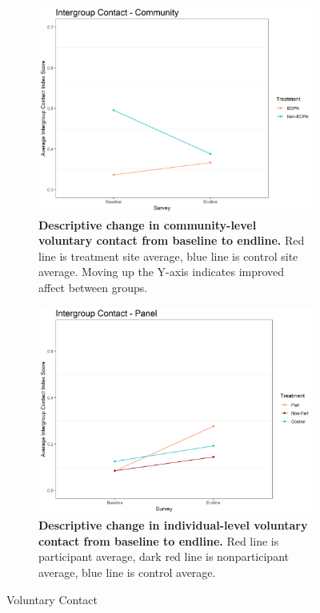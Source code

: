 \documentclass[11pt]{article}
\begin{document}
\begin{figure}[H]
    \begin{subfigure}[b]{.48\textwidth}
    \centering
        \includegraphics[width=\linewidth]{../../../figs/conComm_plot.png}
        \caption{\textbf{Descriptive change in community-level voluntary contact from baseline to endline.} Red line is treatment site average, blue line is control site average.  Moving up the Y-axis indicates improved affect between groups.}
        \label{fig:fig5}
    \end{subfigure}
    \hfill
    \begin{subfigure}[b]{.48\textwidth}
    \centering
        \includegraphics[width=\linewidth]{../../../figs/conPan_plot.png}
        \caption{\textbf{Descriptive change in individual-level voluntary contact from baseline to endline.} Red line is participant average, dark red line is nonparticipant average, blue line is control average.}
        \label{fig:fig6}
    \end{subfigure}
    \caption{Voluntary Contact}
\end{figure}
\end{document}
